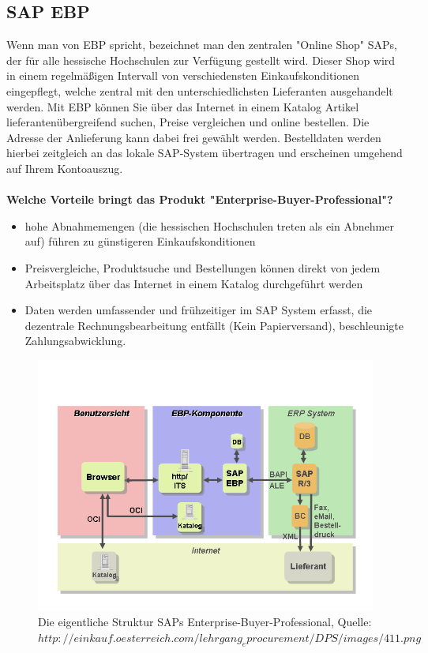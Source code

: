 \documentclass[11pt,a4paper]{article}
\begin{document}
\newpage
\subsection{SAP EBP}

Wenn man von EBP spricht, bezeichnet man den zentralen "Online Shop" SAPs, der für alle hessische Hochschulen zur Verfügung gestellt wird. Dieser Shop wird in einem regelmäßigen Intervall von verschiedensten Einkaufskonditionen eingepflegt, welche zentral mit den unterschiedlichsten Lieferanten ausgehandelt werden. Mit EBP können Sie über das Internet in einem Katalog Artikel lieferantenübergreifend suchen, Preise vergleichen und online bestellen. Die Adresse der Anlieferung kann dabei frei gewählt werden. Bestelldaten werden hierbei zeitgleich an das lokale SAP-System übertragen und erscheinen umgehend auf Ihrem Kontoauszug. \\ \\

\noindent\textbf{Welche Vorteile bringt das Produkt "Enterprise-Buyer-Professional"?}

\begin{itemize}
	\item hohe Abnahmemengen (die hessischen Hochschulen treten als ein Abnehmer auf) führen zu günstigeren Einkaufskonditionen
	\item Preisvergleiche, Produktsuche und Bestellungen können direkt von jedem Arbeitsplatz über das Internet in einem Katalog durchgeführt werden
	\item Daten werden umfassender und frühzeitiger im SAP System erfasst, die dezentrale Rechnungsbearbeitung entfällt (Kein Papierversand), beschleunigte Zahlungsabwicklung.
\end{itemize}

\begin{figure}[ht!]
	\centering
	\includegraphics[width=150mm]{ebp}
	\caption{Die eigentliche Struktur SAPs Enterprise-Buyer-Professional, Quelle: $http://einkauf.oesterreich.com/lehrgang_eprocurement/DPS/images/411.png$ \label{ebp}}
\end{figure}
\newpage
\end{document}
